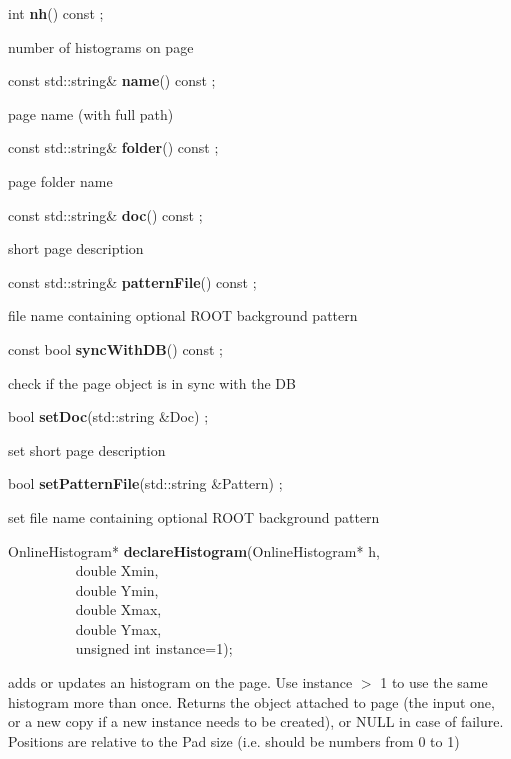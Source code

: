\item    int {\bf nh}() const ;

 number of histograms on page


\item    const std::string\& {\bf name}() const ;

 page name (with full path)


\item    const std::string\& {\bf folder}() const ;

 page folder name


\item    const std::string\& {\bf doc}() const ;

 short page description


\item    const std::string\& {\bf patternFile}() const ;

 file name containing optional ROOT background pattern 


\item    const bool {\bf syncWithDB}() const ;

 check if the page object is in sync with the DB


\item    bool {\bf setDoc}(std::string \&Doc) ;

 set short page description


\item    bool {\bf setPatternFile}(std::string \&Pattern) ;

 set file name containing optional ROOT background pattern 


\item    OnlineHistogram* {\bf declareHistogram}(OnlineHistogram* h,\\\mbox{}~~~~~~~~~
                                    double Xmin,\\\mbox{}~~~~~~~~~
                                    double Ymin,\\\mbox{}~~~~~~~~~
                                    double Xmax,\\\mbox{}~~~~~~~~~
                                    double Ymax,\\\mbox{}~~~~~~~~~
                                    unsigned int instance=1);

 adds or updates an histogram on the page. Use instance $>$ 1 to use the
 same histogram more than once. Returns the object attached to page (the input
 one, or a new copy if a new instance needs to be created), or NULL in case of failure.
 Positions are relative to the Pad size (i.e. should be numbers from 0 to 1)


